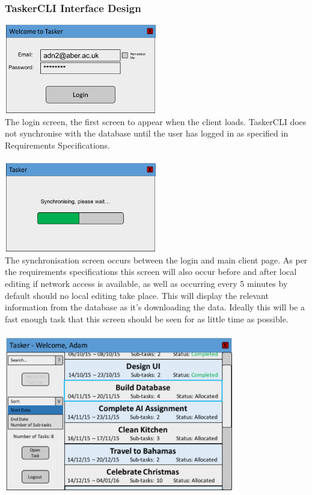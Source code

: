 \documentclass{project}
\begin{document}
\subsubsection{TaskerCLI Interface Design} 
\includegraphics[width=0.5\textwidth, center]{images/5.2/TaskerCLILogin} \\
The login screen, the first screen to appear when the client loads. TaskerCLI does not synchronise with the database until the user has logged in as specified in Requirements Specifications.\cite{se.qa.rs fr8 user id} \\~\\
\newline
\includegraphics[width=0.5\textwidth, center]{images/5.2/TaskerCLILoading} \\
The synchronisation screen occurs between the login and main client page. As per the requirements specifications \cite{se.qa.rs fr11} this screen will also occur before and after local editing if network access is available, as well as occurring every 5 minutes by default should no local editing take place. This will display the relevant information from the database as it's downloading the data. Ideally this will be a fast enough task that this screen should be seen for as little time as possible. \\~\\
\newline
\includegraphics[width=0.75\textwidth, center]{images/5.2/TaskerCLIMainScreen} \\
\end{document}

